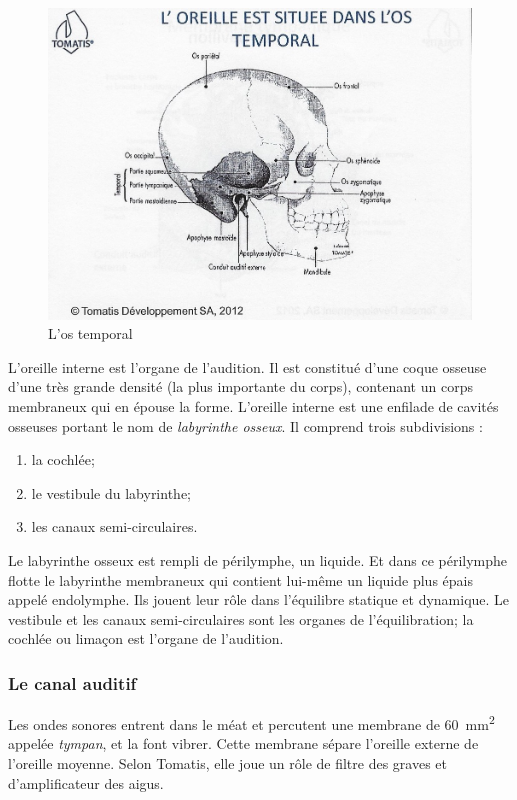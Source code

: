 \begin{figure}
	\centering
	\includegraphics[width=0.7\linewidth]{images/Loreilleostemporal_crane.jpg}
	\caption[L'os temporal]{L'os temporal}
	\label{fig:loreilleostemporal18}
\end{figure}

L'oreille interne est l'organe de l'audition. Il
est constitué d'une coque osseuse d'une très grande densité (la plus
importante du corps), contenant un corps membraneux qui en épouse
la forme. 
L'oreille interne est une enfilade de cavités osseuses portant 
le nom de \emph{labyrinthe osseux}. Il comprend trois subdivisions : 
\begin{enumerate}
	\item la cochlée;
	\item le vestibule du labyrinthe;
	\item  les canaux semi-circulaires.
\end{enumerate}

Le labyrinthe
osseux est rempli de périlymphe, un liquide. Et dans ce périlymphe
flotte le labyrinthe membraneux qui contient lui-même un liquide
plus épais appelé endolymphe. Ils jouent leur rôle dans l'équilibre
statique et dynamique. Le vestibule et les canaux semi-circulaires
sont les organes de l'équilibration; la cochlée ou
limaçon est l'organe de l'audition. 

\subsubsection{Le canal auditif}
Les ondes sonores entrent dans le méat et percutent
une membrane de \SI{60}{\milli\metre\squared} appelée \emph{tympan}, et la font vibrer. Cette membrane
sépare l'oreille externe de l'oreille moyenne. Selon Tomatis, elle
joue un rôle de filtre des graves et d'amplificateur des aigus.



